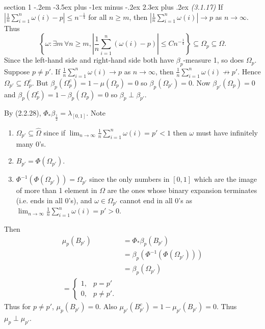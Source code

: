 \documentclass[12pt]{article}
\makeatletter
\theoremstyle{norm}
\newcommand{\N}[0]{\mathbb{N}}
\newcommand{\rc}[1]{\frac{1}{#1}}
\newcommand{\subeq}[0]{\subseteq}
\newcommand{\be}[0]{\beta}
\newcommand{\la}[0]{\lambda}
\newcommand{\om}[0]{\omega}
\newcommand{\Om}[0]{\Omega}
\newcommand{\ab}[1]{\left| {#1} \right|}
\newcommand{\bc}[1]{\left\{ {#1} \right\}}
\newcommand{\bs}[0]{\backslash}
\newcommand{\iy}[0]{\infty}
\newenvironment{problem}{\@startsection
       {section}
       {1}
       {-.2em}
       {-3.5ex plus -1ex minus -.2ex}
       {2.3ex plus .2ex}
       {\pagebreak[3]%
       \large\bf\noindent{Problem }
       }
       }
       {%
       }
\makeatother
\begin{document}
\begin{problem}{\it(3.1.17)}
If $\ab{\rc n\sum_{i=1}^n \om(i)-p}\le n^{-\rc 4}$ for all $n\ge m$, then $\ab{\rc n\sum_{i=1}^n \om(i)}\to p$ as $n\to\iy$. Thus
\[
\bc{\om:
\exists m\,\forall n\ge m,\ab{\rc{n}\sum_{i=1}^n(\om(i)-p)}\le Cn^{-\rc{4}}}\subeq \Om_p\subeq \Om.
\]
Since the left-hand side and right-hand side both have $\be_p$-measure 1, so does $\Om_p$. Suppose $p\neq p'$. If $\rc{n}\sum_{i=1}^n \om(i)\to p$ as $n\to \iy$, then $\rc{n}\sum_{i=1}^n \om(i)\not\to p'$. %
Hence $\Om_{p'}\subeq \Om_{p}^c$. But $\be_p(\Om_{p}^c)=1-\mu(\Om_p)=0$ so $\be_p(\Om_{p'})=0$. Now $\be_{p'}(\Om_p)=0$ and $\be_p(\Om_p^c)=1-\be_p(\Om_p)=0$ so $\be_p\perp \be_{p'}$.

By (2.2.28), $\Phi_*\be_{\rc 2}=\la_{[0,1]}$. Note 
\begin{enumerate}
\item
$\Omega_{p'}\subeq \hat{\Omega}$ since if $\lim_{n\to \iy} \rc{n}\sum_{i=1}^n \om(i)=p'<1$ then $\om$ must have infinitely many 0's.
\item $B_{p'}=\Phi(\Om_{p'})$.
\item $\Phi^{-1}(\Phi(\Om_{p'}))=\Om_{p'}$ since the only numbers in $[0,1]$ which are the image of more than 1 element in $\Om$ are the ones whose binary expansion terminates (i.e. ends in all 0's), and $\om\in \Om_{p'}$ cannot end in all 0's as $\lim_{n\to \iy} \rc n\sum_{i=1}^n \om(i)=p'>0$.
\end{enumerate}
Then
\begin{align*}
\mu_p(B_{p'})&=\Phi_*\be_p(B_{p'})\\
&=\be_p(\Phi^{-1}(\Phi(\Om_{p'})))\\
&=\be_p(\Om_{p'})\\
=\begin{cases}
1,&p=p'\\
0,&p\ne p'.
\end{cases}
\end{align*}
Thus for $p\ne p'$, $\mu_p(B_{p'})=0$. Also $\mu_{p'}(B_{p'}^c)=1-\mu_{p'}(B_{p'})=0$. Thus $\mu_p\perp \mu_{p'}$.


\end{problem}
\end{document}
